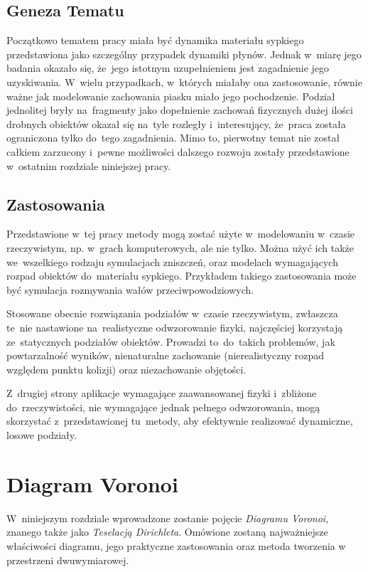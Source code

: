 \documentclass[skorowidz,autorrok,backref,xodstep,oswiadczenie]{wmimgr}
\begin{document}
\section{Geneza Tematu}

Początkowo tematem pracy miała być dynamika materiału sypkiego przedstawiona jako szczególny przypadek dynamiki płynów. Jednak w~miarę jego badania okazało się, że~jego istotnym uzupełnieniem jest zagadnienie jego uzyskiwania. W~wielu przypadkach, w~których miałaby ona zastosowanie, równie ważne jak modelowanie zachowania piasku miało jego pochodzenie. Podział jednolitej bryły na~fragmenty jako dopełnienie zachowań fizycznych dużej ilości drobnych obiektów okazał się na~tyle rozległy i~interesujący, że~praca została ograniczona tylko do~tego zagadnienia. Mimo to, pierwotny temat nie został całkiem zarzucony i~pewne możliwości dalszego rozwoju zostały przedstawione w~ostatnim rozdziale niniejszej pracy.

\section{Zastosowania}

Przedstawione w~tej pracy metody mogą zostać użyte w~modelowaniu w~czasie rzeczywistym, np. w~grach komputerowych, ale nie tylko. Można użyć ich także we~wszelkiego rodzaju symulacjach zniszczeń, oraz modelach wymagających rozpad obiektów do~materiału sypkiego. Przykładem takiego zastosowania może być symulacja rozmywania wałów przeciwpowodziowych.

Stosowane obecnie rozwiązania podziałów w~czasie rzeczywistym, zwłaszcza te~nie nastawione na~realistyczne odwzorowanie fizyki, najczęściej korzystają ze~statycznych podziałów obiektów. Prowadzi to~do~takich problemów, jak powtarzalność wyników, nienaturalne zachowanie (nierealistyczny rozpad względem punktu kolizji) oraz niezachowanie objętości.

Z~drugiej strony aplikacje wymagające zaawansowanej fizyki i~zbliżone do~rzeczywistości, nie wymagające jednak pełnego odwzorowania, mogą skorzystać z~przedstawionej tu~metody, aby efektywnie realizować dynamiczne, losowe podziały.

\chapter{Diagram Voronoi}

W~niniejszym rozdziale wprowadzone zostanie pojęcie \emph{Diagramu Voronoi}, znanego także jako \emph{Teselacją Dirichleta}. Omówione zostaną najważniejsze właściwości diagramu, jego praktyczne zastosowania oraz metoda tworzenia w przestrzeni dwuwymiarowej.
\end{document}
